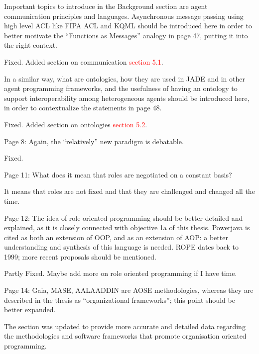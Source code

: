 \documentclass{article}
\newcommand*\R[1]{\textcolor{red}{#1}} %
\newenvironment{them}{\noindent\begingroup\color{blue}}{\endgroup\par}
\begin{document}
\begin{them}

Important topics to introduce in the Background section are agent communication
principles and languages. Asynchronous message passing using high level ACL
like FIPA ACL and KQML should be introduced here in order to better motivate
the “Functions as Messages” analogy in page 47, putting it into the right
context.

\end{them}
Fixed. Added section on communication \R{section 5.1}.

\begin{them}

In a similar way, what are ontologies, how they are used in JADE and in other
agent programming frameworks, and the usefulness of having an ontology to
support interoperability among heterogeneous agents should be introduced here,
in order to contextualize the statements in page 48.

\end{them}
Fixed. Added section on ontologies \R{section 5.2}.

\begin{them}

Page 8:
Again, the “relatively” new paradigm is debatable.
\end{them}
Fixed. 

\begin{them}

Page 11:
What does it mean that roles are negotiated on a constant basis?
\end{them}
It means that roles are not fixed and that they are challenged and changed all
the time.  

\begin{them}

Page 12:
The idea of role oriented programming should be better detailed and explained,
as it is closely connected with objective 1a of this thesis. Powerjava is cited
as both an extension of OOP, and as an extension of AOP: a better understanding
and synthesis of this language is needed. ROPE dates back to 1999; more recent
proposals should be mentioned.

\end{them}
Partly Fixed. Maybe add more on role oriented programming if I have time.

\begin{them}

Page 14:
Gaia, MASE, AALAADDIN are AOSE methodologies, whereas they are described in the
thesis as “organizational frameworks”; this point should be better expanded.

\end{them}
The section was updated to provide more accurate and detailed data regarding
the methodologies and software frameworks that promote organisation oriented
programming.
\end{document}
